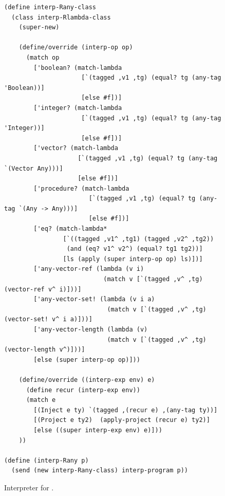 \documentclass[11pt]{book}
\begin{document}
\begin{figure}[btp]
\begin{lstlisting}
(define interp-Rany-class
  (class interp-Rlambda-class
    (super-new)

    (define/override (interp-op op)
      (match op
        ['boolean? (match-lambda
                     [`(tagged ,v1 ,tg) (equal? tg (any-tag 'Boolean))]
                     [else #f])]
        ['integer? (match-lambda
                     [`(tagged ,v1 ,tg) (equal? tg (any-tag 'Integer))]
                     [else #f])]
        ['vector? (match-lambda
                    [`(tagged ,v1 ,tg) (equal? tg (any-tag `(Vector Any)))]
                    [else #f])]
        ['procedure? (match-lambda
                       [`(tagged ,v1 ,tg) (equal? tg (any-tag `(Any -> Any)))]
                       [else #f])]
        ['eq? (match-lambda*
                [`((tagged ,v1^ ,tg1) (tagged ,v2^ ,tg2))
                 (and (eq? v1^ v2^) (equal? tg1 tg2))]
                [ls (apply (super interp-op op) ls)])]
        ['any-vector-ref (lambda (v i)
                           (match v [`(tagged ,v^ ,tg) (vector-ref v^ i)]))]
        ['any-vector-set! (lambda (v i a)
                            (match v [`(tagged ,v^ ,tg) (vector-set! v^ i a)]))]
        ['any-vector-length (lambda (v)
                            (match v [`(tagged ,v^ ,tg) (vector-length v^)]))]
        [else (super interp-op op)]))

    (define/override ((interp-exp env) e)
      (define recur (interp-exp env))
      (match e
        [(Inject e ty) `(tagged ,(recur e) ,(any-tag ty))]
        [(Project e ty2)  (apply-project (recur e) ty2)]
        [else ((super interp-exp env) e)]))
    ))

(define (interp-Rany p)
  (send (new interp-Rany-class) interp-program p))
\end{lstlisting}
\caption{Interpreter for \LangAny{}.}
\label{fig:interp-Rany}
\end{figure}
\end{document}
